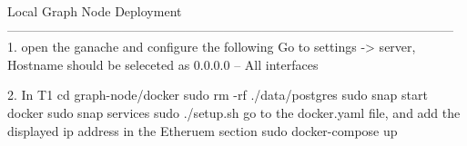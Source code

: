 Local Graph Node Deployment
---------------------------------------------------------------------------------------------------------
1. open the ganache and configure the following
    Go to settings -> server, Hostname should be seleceted as 0.0.0.0 – All interfaces

2. In T1
  cd graph-node/docker
  sudo rm -rf ./data/postgres
  sudo snap start docker
  sudo snap services
  sudo ./setup.sh
  go to the docker.yaml file, and add the displayed ip address in the Etheruem section
  sudo docker-compose up